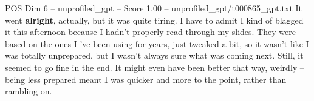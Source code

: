 \begin{textsample}{POS Dim 6 – unprofiled\_gpt – Score 1.00 – unprofiled\_gpt/t000865\_gpt.txt}  \label{ex:f6_pos_027}
It went \textbf{alright}, actually, but it was quite tiring.
I have to admit I kind of blagged it this afternoon because I hadn't properly read through my slides.
They were based on the ones I ’ve been using for years, just tweaked a bit, so it wasn't like I was totally unprepared, but I wasn't always sure what was coming next.
Still, it seemed to go fine in the end.
It might even have been better that way, weirdly – being less prepared meant I was quicker and more to the point, rather than rambling on.

\end{textsample}
